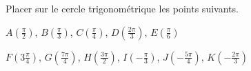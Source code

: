 
Placer sur le cercle trigonométrique les points suivants.

$A \left( \frac{\pi}{2} \right)$, $B \left( \frac{\pi}{3} \right)$, $C \left( \frac{\pi}{4} \right)$, $D \left( \frac{2\pi}{3} \right)$, $E \left( \frac{\pi}{6} \right)$

$F \left( 3\frac{\pi}{4} \right)$, $G \left( \frac{7\pi}{4} \right)$, $H \left( \frac{3\pi}{2} \right)$, $I \left( -\frac{\pi}{3} \right)$, $J \left(- \frac{5\pi}{4} \right)$, $K \left( -\frac{2\pi}{3} \right)$